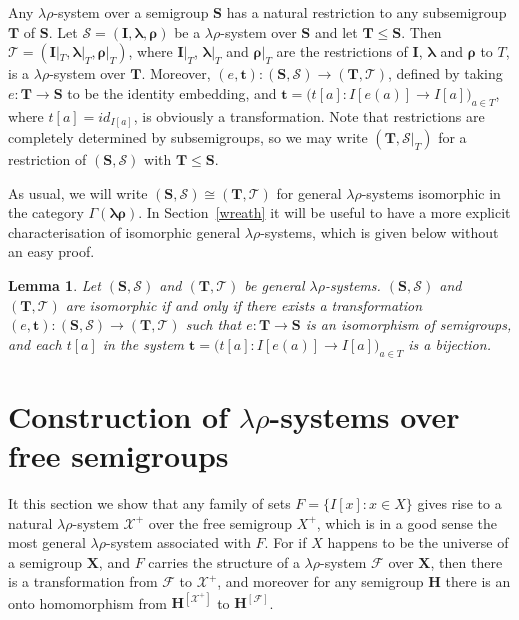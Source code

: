 \documentclass{amsart}
\newtheorem{lemma}{Lemma}
\newcommand{\blambda}{\boldsymbol{\lambda}}
\newcommand{\brho}{\boldsymbol{\rho}}
\begin{document}
Any $\lambda\rho$-system over a semigroup
$\mathbf{S}$ has a natural restriction to any subsemigroup $\mathbf{T}$ of
$\mathbf{S}$.  
Let $\mathcal{S} = (\mathbf{I}, \boldsymbol{\lambda},\boldsymbol{\rho})$
be a $\lambda\rho$-system over $\mathbf{S}$  and\/ let $\mathbf{T}\leq\mathbf{S}$. Then
$\mathcal{T} = (\mathbf{I}|_T,\blambda|_T,\brho|_T)$, where
$\mathbf{I}|_T$, $\blambda|_T$ and $\brho|_T$ are the restrictions of\/
$\mathbf{I}$, $\blambda$ and $\brho$ to $T$,  
is a $\lambda\rho$-system over $\mathbf{T}$. Moreover,
$(e,\mathbf{t})\colon (\mathbf{S},\mathcal{S})\to(\mathbf{T},\mathcal{T})$, defined by
taking $e\colon\mathbf{T}\to\mathbf{S}$ to be the identity embedding,
and $\mathbf{t} = \bigl(t[a]\colon I[e(a)] \to I[a]\bigr)_{a\in T}$,
where $t[a] = {id}_{I[a]}$, is obviously a transformation.
Note that restrictions are completely determined by subsemigroups, so 
we may write $(\mathbf{T}, \mathcal{S}|_T)$ for a restriction
of $(\mathbf{S},\mathcal{S})$ with $\mathbf{T}\leq\mathbf{S}$.


As usual, we will write
$(\mathbf{S},\mathcal{S})\cong(\mathbf{T},\mathcal{T})$
for general $\lambda\rho$-systems isomorphic in the category
$\mathsf{\Gamma}(\boldsymbol{\lambda\rho})$.
In Section~\ref{wreath} it will be useful to have 
a more explicit characterisation of isomorphic 
general $\lambda\rho$-systems, which is given below without an easy proof.  

\begin{lemma}\label{isom}
Let $(\mathbf{S},\mathcal{S})$ and $(\mathbf{T},\mathcal{T})$ be general
$\lambda\rho$-systems. $(\mathbf{S},\mathcal{S})$ and
$(\mathbf{T},\mathcal{T})$ are isomorphic if and only if 
there exists a transformation $(e,\mathbf{t})\colon
(\mathbf{S},\mathcal{S})\to(\mathbf{T},\mathcal{T})$ such that
$e\colon\mathbf{T}\to\mathbf{S}$ is an isomorphism of semigroups, and each
$t[a]$ in the system  
$\mathbf{t} = \bigl(t[a]\colon I[e(a)] \to I[a]\bigr)_{a\in T}$
is a bijection.
\end{lemma}  



\section{Construction of $\lambda\rho$-systems over free
  semigroups}\label{free-constr} 

It this section we show that any family of sets $F = \{I[x]: x\in X\}$
gives rise to a natural $\lambda\rho$-system $\mathcal{X}^+$ over the free
semigroup $X^+$, which
is in a good sense the most general
$\lambda\rho$-system associated with $F$. For if $X$ happens to be the
universe of a semigroup $\mathbf{X}$, and $F$ carries the
structure of a $\lambda\rho$-system $\mathcal{F}$ over $\mathbf{X}$, then there is a
transformation from $\mathcal{F}$ to $\mathcal{X}^+$, and moreover for any
semigroup $\mathbf{H}$ there is an onto homomorphism from
$\mathbf{H}^{[\mathcal{X}^+]}$ to $\mathbf{H}^{[\mathcal{F}]}$.   
\end{document}
